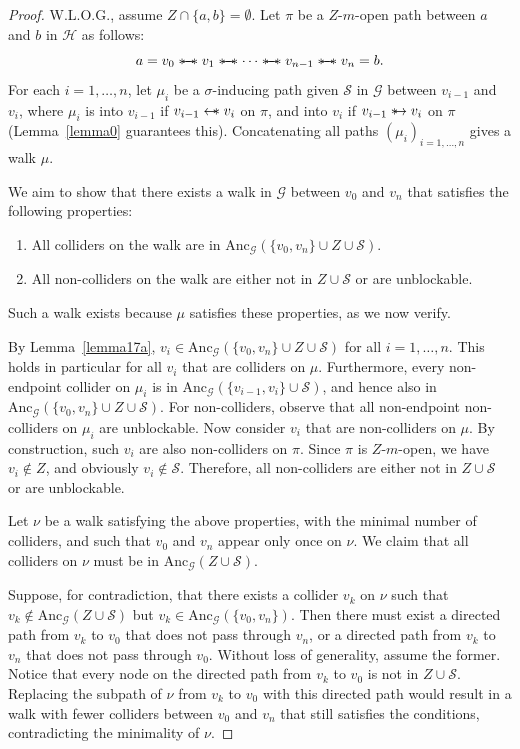 \documentclass[accepted]{uai2025} %
\newcommand{\anc}{\text{Anc}}
\newcommand{\hus}{\mathrel{{\leftarrow\mkern-11mu\ast}}}
\newcommand{\suh}{\mathrel{{\ast\mkern-11mu\to}}}
\newcommand{\sus}{\mathrel{{\ast\mkern-11mu\relbar\mkern-9mu\relbar\mkern-11mu\ast}}}
\begin{document}
\lemmaseventeenb*
\begin{proof}
W.L.O.G., assume $Z\cap\{a,b\}=\emptyset$. Let $\pi$ be a $Z$-$m$-open path between $a$ and $b$ in $\mathcal{H}$ as follows:
$$
a=v_0\sus v_1\sus\cdots\sus v_{n-1}\sus v_n=b.
$$
For each $i = 1, \ldots, n$, let $\mu_i$ be a $\sigma$-inducing path given $\mathcal{S}$ in $\mathcal{G}$ between $v_{i-1}$ and $v_i$, where $\mu_i$ is into $v_{i-1}$ if $v_{i-1} \hus  v_i$ on $\pi$, and into $v_i$ if $v_{i-1} \suh v_i$ on $\pi$ (Lemma~\ref{lemma0} guarantees this). Concatenating all paths $(\mu_i)_{i=1,\ldots,n}$ gives a walk $\mu$. 

We aim to show that there exists a walk in $\mathcal{G}$ between $v_0$ and $v_n$ that satisfies the following properties:
\begin{enumerate}
    \item All colliders on the walk are in $\anc_\mathcal{G}(\{v_0, v_n\} \cup Z \cup \mathcal{S})$.
    \item All non-colliders on the walk are either not in $Z \cup \mathcal{S}$ or are unblockable.
\end{enumerate}
Such a walk exists because $\mu$ satisfies these properties, as we now verify.

By Lemma~\ref{lemma17a}, $v_i \in \anc_\mathcal{G}(\{v_0, v_n\} \cup Z \cup \mathcal{S})$ for all $i = 1, \ldots, n$. This holds in particular for all $v_i$ that are colliders on $\mu$. Furthermore, every non-endpoint collider on $\mu_i$ is in $\anc_\mathcal{G}(\{v_{i-1}, v_i\} \cup \mathcal{S})$, and hence also in $\anc_\mathcal{G}(\{v_0, v_n\} \cup Z \cup \mathcal{S})$. For non-colliders, observe that all non-endpoint non-colliders on $\mu_i$ are unblockable. Now consider $v_i$ that are non-colliders on $\mu$. By construction, such $v_i$ are also non-colliders on $\pi$. Since $\pi$ is $Z$-$m$-open, we have $v_i \notin Z$, and obviously $v_i \notin \mathcal{S}$. Therefore, all non-colliders are either not in $Z \cup \mathcal{S}$ or are unblockable.

Let $\nu$ be a walk satisfying the above properties, with the minimal number of colliders, and such that $v_0$ and $v_n$ appear only once on $\nu$. We claim that all colliders on $\nu$ must be in $\anc_\mathcal{G}(Z \cup \mathcal{S})$.

Suppose, for contradiction, that there exists a collider $v_k$ on $\nu$ such that $v_k \notin \anc_\mathcal{G}(Z \cup \mathcal{S})$ but $v_k \in \anc_\mathcal{G}(\{v_0, v_n\})$. Then there must exist a directed path from $v_k$ to $v_0$ that does not pass through $v_n$, or a directed path from $v_k$ to $v_n$ that does not pass through $v_0$. Without loss of generality, assume the former. Notice that every node on the directed path from $v_k$ to $v_0$ is not in $Z \cup \mathcal{S}$. Replacing the subpath of $\nu$ from $v_k$ to $v_0$ with this directed path would result in a walk with fewer colliders between $v_0$ and $v_n$ that still satisfies the conditions, contradicting the minimality of $\nu$.


\end{proof}
\end{document}
